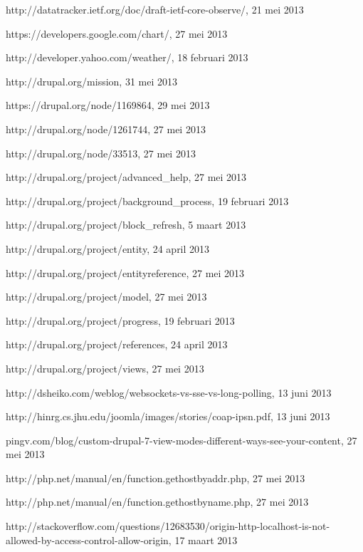 \begin{thebibliography}{99}
 http://datatracker.ietf.org/doc/draft-ietf-core-observe/, 21 mei 2013

 https://developers.google.com/chart/, 27 mei 2013

 http://developer.yahoo.com/weather/, 18 februari 2013

 http://drupal.org/mission, 31 mei 2013

 https://drupal.org/node/1169864, 29 mei 2013

 http://drupal.org/node/1261744, 27 mei 2013

 http://drupal.org/node/33513, 27 mei 2013

 http://drupal.org/project/advanced\_help, 27 mei 2013

 http://drupal.org/project/background\_process, 19 februari 2013

 http://drupal.org/project/block\_refresh, 5 maart 2013

 http://drupal.org/project/entity, 24 april 2013

 http://drupal.org/project/entityreference, 27 mei 2013

 http://drupal.org/project/model, 27 mei 2013

 http://drupal.org/project/progress, 19 februari 2013

 http://drupal.org/project/references, 24 april 2013

 http://drupal.org/project/views, 27 mei 2013

 http://dsheiko.com/weblog/websockets-vs-sse-vs-long-polling, 13 juni 2013

 http://hinrg.cs.jhu.edu/joomla/images/stories/coap-ipsn.pdf, 13 juni 2013

 pingv.com/blog/custom-drupal-7-view-modes-different-ways-see-your-content, 27 mei 2013

 http://php.net/manual/en/function.gethostbyaddr.php, 27 mei 2013

 http://php.net/manual/en/function.gethostbyname.php, 27 mei 2013

 http://stackoverflow.com/questions/12683530/origin-http-localhost-is-not-allowed-by-access-control-allow-origin, 17 maart 2013


\end{thebibliography}
